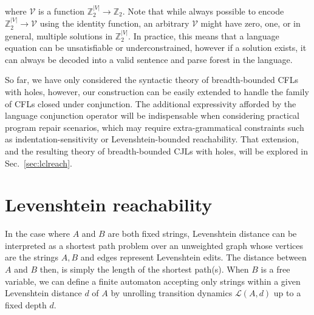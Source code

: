 \documentclass[sigplan,review,anonymous,acmsmall]{acmart}\settopmatter{printfolios=false,printccs=false,printacmref=false}
\begin{document}
\noindent where $\mathcal{V}$ is a function $\mathbb{Z}_2^{|V|}\rightarrow\mathbb{Z}_2$. Note that while always possible to encode $\mathbb{Z}_2^{|V|} \rightarrow \mathcal{V}$ using the identity function, an arbitrary $\mathcal{V}$ might have zero, one, or in general, multiple solutions in $\mathbb{Z}_2^{|V|}$. In practice, this means that a language equation can be unsatisfiable or underconstrained, however if a solution exists, it can always be decoded into a valid sentence and parse forest in the language.

So far, we have only considered the syntactic theory of breadth-bounded CFLs with holes, however, our construction can be easily extended to handle the family of CFLs closed under conjunction. The additional expressivity afforded by the language conjunction operator will be indispensable when considering practical program repair scenarios, which may require extra-grammatical constraints such as indentation-sensitivity or Levenshtein-bounded reachability. That extension, and the resulting theory of breadth-bounded CJLs with holes, will be explored in Sec.~\ref{sec:lclreach}.

\section{Levenshtein reachability}\label{sec:levenshtein}

%
%

In the case where $A$ and $B$ are both fixed strings, Levenshtein distance can be interpreted as a shortest path problem over an unweighted graph whose vertices are the strings $A, B$ and edges represent Levenshtein edits. The distance between $A$ and $B$ then, is simply the length of the shortest path(s). When $B$ is a free variable, we can define a finite automaton accepting only strings within a given Levenshtein distance $d$ of $A$ by unrolling transition dynamics $\mathcal{L}(A, d)$ up to a fixed depth $d$.
\end{document}
